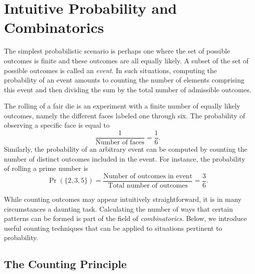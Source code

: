 \chapter{Intuitive Probability and Combinatorics}

The simplest probabilistic scenario is perhaps one where the set of possible outcomes is finite and these outcomes are all equally likely.
A subset of the set of possible outcomes is called an \emph{event}.
In such situations, computing the probability of an event amounts to counting the number of elements comprising this event and then dividing the sum by the total number of admissible outcomes.

\begin{example}
The rolling of a fair die is an experiment with a finite number of equally likely outcomes, namely the different faces labeled one through six.
The probability of observing a specific face is equal to
\begin{equation*}
\frac{1}{\text{Number of faces}} = \frac{1}{6} .
\end{equation*}
Similarly, the probability of an arbitrary event can be computed by counting the number of distinct outcomes included in the event.
For instance, the probability of rolling a prime number is
\begin{equation*}
\Pr ( \{ 2, 3, 5 \} )
= \frac{\text{Number of outcomes in event}}{\text{Total number of outcomes}}
= \frac{3}{6} .
\end{equation*}
\end{example}

While counting outcomes may appear intuitively straightforward, it is in many circumstances a daunting task.
Calculating the number of ways that certain patterns can be formed is part of the field of \emph{combinatorics}. 
Below, we introduce useful counting techniques that can be applied to situations pertinent to probability.


\section{The Counting Principle}

